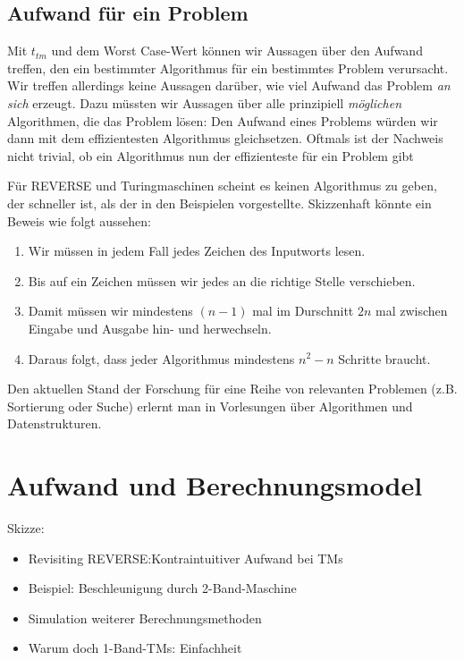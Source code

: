 \subsection{Aufwand für ein Problem}
Mit $t_{tm}$ und dem Worst Case-Wert können wir Aussagen über den Aufwand treffen,
den ein bestimmter Algorithmus für ein bestimmtes Problem verursacht.
Wir treffen allerdings keine Aussagen darüber,
wie viel Aufwand das Problem \emph{an sich} erzeugt.
Dazu müssten wir Aussagen über alle prinzipiell \emph{möglichen} Algorithmen,
die das Problem lösen:
Den Aufwand eines Problems würden wir dann mit dem effizientesten Algorithmus gleichsetzen.
Oftmals ist der Nachweis nicht trivial,
ob ein Algorithmus nun der effizienteste für ein Problem gibt

Für REVERSE und Turingmaschinen scheint es keinen Algorithmus zu geben,
der schneller ist, als der in den Beispielen vorgestellte.
Skizzenhaft könnte ein Beweis wie folgt aussehen:
\begin{enumerate}
        \item Wir müssen in jedem Fall jedes Zeichen des Inputworts lesen.
        \item Bis auf ein Zeichen müssen wir jedes an die richtige Stelle verschieben.
        \item Damit müssen wir mindestens $(n-1)$ mal im Durschnitt $2n$ mal
            zwischen Eingabe und Ausgabe hin- und herwechseln.
        \item Daraus folgt, dass jeder Algorithmus mindestens $n^2 - n$ Schritte braucht.
\end{enumerate}

Den aktuellen Stand der Forschung für eine Reihe von relevanten Problemen
(z.B. Sortierung oder Suche) erlernt man in Vorlesungen über
Algorithmen und Datenstrukturen.



\section{Aufwand und Berechnungsmodel}
Skizze:
\begin{itemize}
        \item Revisiting REVERSE:\@ Kontraintuitiver Aufwand bei TMs
        \item Beispiel: Beschleunigung durch 2-Band-Maschine
        \item Simulation weiterer Berechnungsmethoden
        \item Warum doch 1-Band-TMs: Einfachheit
\end{itemize}

